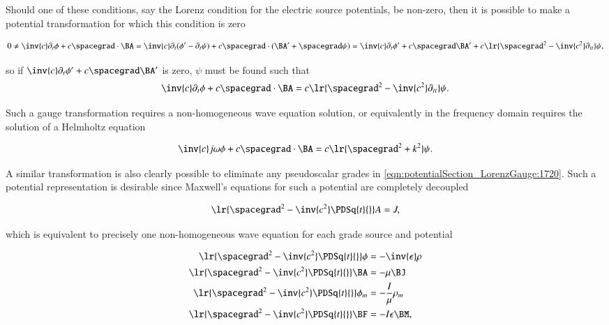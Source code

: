 Should one of these conditions, say the Lorenz condition for the electric source potentials, be non-zero, then it is possible to make a potential transformation for which this condition is zero

\begin{dmath}\label{eqn:potentialSection_LorenzGauge:1680}
0 \ne
\inv{c} \partial_t \phi + c \spacegrad \cdot \BA
=
\inv{c} \partial_t (\phi' - \partial_t \psi) + c \spacegrad \cdot (\BA' + \spacegrad \psi)
=
\inv{c} \partial_t \phi' + c \spacegrad \BA'
+ c \lr{ \spacegrad^2 - \inv{c^2} \partial_{tt} } \psi,
\end{dmath}

so if \( \inv{c} \partial_t \phi' + c \spacegrad \BA' \) is zero, \( \psi \) must be found such that
\begin{dmath}\label{eqn:potentialSection_LorenzGauge:1700}
\inv{c} \partial_t \phi + c \spacegrad \cdot \BA
= c \lr{ \spacegrad^2 - \inv{c^2} \partial_{tt} } \psi.
\end{dmath}

Such a gauge transformation requires a non-homogeneous wave equation solution, or equivalently in the frequency domain requires the solution of a Helmholtz equation

\begin{dmath}\label{eqn:potentialSection_LorenzGauge:1740}
\inv{c} j \omega \phi + c \spacegrad \cdot \BA
= c \lr{ \spacegrad^2 + k^2 } \psi.
\end{dmath}

A similar transformation is also clearly possible to eliminate any pseudoscalar grades in \cref{eqn:potentialSection_LorenzGauge:1720}.
Such a potential representation is desirable since
Maxwell's equations for such a potential are completely decoupled

\begin{dmath}\label{eqn:potentialSection_LorenzGauge:1760}
\lr{ \spacegrad^2 - \inv{c^2} \PDSq{t}{} } A = J,
\end{dmath}

which is equivalent to precisely one non-homogeneous wave equation for each grade source and potential

\begin{dmath}\label{eqn:potentialSection_LorenzGauge:1600}
\begin{aligned}
\lr{ \spacegrad^2 - \inv{c^2} \PDSq{t}{} } \phi &= - \inv{\epsilon} \rho \\
\lr{ \spacegrad^2 - \inv{c^2} \PDSq{t}{} } \BA &= - \mu \BJ \\
\lr{ \spacegrad^2 - \inv{c^2} \PDSq{t}{} } \phi_m &= - \frac{I}{\mu} \rho_m \\
\lr{ \spacegrad^2 - \inv{c^2} \PDSq{t}{} } \BF &= - I \epsilon \BM,
\end{aligned}
\end{dmath}

